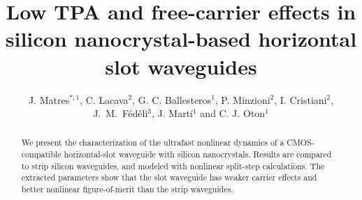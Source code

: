 \documentclass[10pt,letterpaper]{article}
\begin{document}
\title{Low TPA and free-carrier effects in silicon nanocrystal-based horizontal slot waveguides}
\author{J. Matres$^{*,1}$, C. Lacava$^2$, G. C. Ballesteros$^1$, P. Minzioni$^2$, I. Cristiani$^2$, J.~M.~F\'ed\'eli$^3$, J. Mart\'i$^1$ and C. J. Oton$^1$} 
\address{$^1$ Nanophotonics Technology Center, \\ Universidad Polit\'ecnica de Valencia, Camino de Vera s/n, 46022, Valencia, Spain\\
$^2$Dipartimento di Ingegneria Industriale e dell'Informazione, Universita di Pavia, Via Ferrata 1, 27100, Pavia, Italy\\
$^3$CEA LETI, Minatec Campus, Grenoble 38054, France}



\begin{abstract}
We present the characterization of the ultrafast nonlinear dynamics of a CMOS-compatible horizontal-slot waveguide with silicon nanocrystals. Results are compared to strip silicon waveguides, and modeled with nonlinear split-step calculations. The extracted parameters show that the slot waveguide has weaker carrier effects and better nonlinear figure-of-merit than the strip waveguides. 
\end{abstract}




\end{document}
